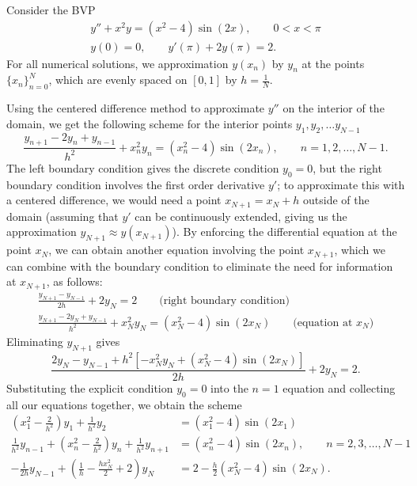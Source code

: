 \documentclass{homework}
\begin{document}
	\question Consider the BVP
	\begin{gather*}
		y'' + x^2y = (x^2-4)\sin(2x), \qquad 0 < x < \pi \\
		y(0) = 0, \qquad y'(\pi) + 2y(\pi) = 2.
	\end{gather*}
	For all numerical solutions, we approximation $y(x_n)$ by $y_n$ at the points $\{x_n\}_{n=0}^N$, which are evenly spaced on $[0,1]$ by $h = \frac{1}{N}$.
	\begin{alphaparts}
		\questionpart Using the centered difference method to approximate $y''$ on the interior of the domain, we get the following scheme for the interior points $y_1, y_2, \dots y_{N-1}$
		\begin{equation*}
			\frac{y_{n+1} - 2y_n + y_{n-1}}{h^2} + x_n^2y_n = (x_n^2- 4)\sin(2x_n), \qquad n = 1, 2, \dots, N-1.
		\end{equation*}
		The left boundary condition gives the discrete condition $y_0 = 0$, but the right boundary condition involves the first order derivative $y'$; to approximate this with a centered difference, we would need a point $x_{N+1} = x_N + h$ outside of the domain (assuming that $y'$ can be continuously extended, giving us the approximation $y_{N+1} \approx y(x_{N+1})$). By enforcing the differential equation at the point $x_N$, we can obtain another equation involving the point $x_{N+1}$, which we can combine with the boundary condition to eliminate the need for information at $x_{N+1}$, as follows:
		\begin{gather*}
			\frac{y_{N+1}-y_{N-1}}{2h} + 2y_N = 2 \qquad \text{(right boundary condition)}\\
			\frac{y_{N+1} - 2y_N + y_{N-1}}{h^2} + x_N^2y_N = (x_N^2-4)\sin(2x_N) \qquad \text{(equation at $x_N$)}
		\end{gather*}
		Eliminating $y_{N+1}$ gives
		\begin{equation*}
			\frac{2y_{N} -y_{N-1} +h^2\left[-x_N^2y_N + (x_N^2 - 4)\sin(2x_N)\right]}{2h} + 2y_N = 2.
		\end{equation*}
		Substituting the explicit condition $y_0 = 0$ into the $n =1$ equation and collecting all our equations together, we obtain the scheme
		\begin{align*}
			\left(x_1^2 - \frac{2}{h^2}\right)y_1 + \frac{1}{h^2}y_2 &= (x_1^2-4)\sin(2x_1) \\
			\frac{1}{h^2}y_{n-1} + \left(x_n^2 - \frac{2}{h^2}\right)y_n + \frac{1}{h^2}y_{n+1} &= (x_n^2-4)\sin(2x_n), \qquad n = 2,3,\dots, N-1 \\
			 -\frac{1}{2h}y_{N-1} + \left(\frac{1}{h} -\frac{hx_N^2}{2} + 2\right)y_N &= 2-\frac{h}{2}(x_N^2-4)\sin(2x_N).

\end{align*}
\end{alphaparts}
\end{document}

